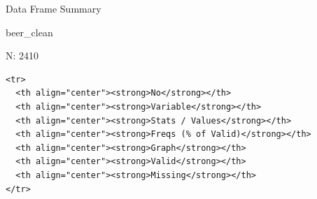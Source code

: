 \documentclass[]{article}
\newenvironment{Shaded}{\begin{snugshade}}{\end{snugshade}}
\newcommand{\KeywordTok}[1]{\textcolor[rgb]{0.13,0.29,0.53}{\textbf{#1}}}
\newcommand{\DataTypeTok}[1]{\textcolor[rgb]{0.13,0.29,0.53}{#1}}
\newcommand{\StringTok}[1]{\textcolor[rgb]{0.31,0.60,0.02}{#1}}
\newcommand{\CommentTok}[1]{\textcolor[rgb]{0.56,0.35,0.01}{\textit{#1}}}
\newcommand{\OperatorTok}[1]{\textcolor[rgb]{0.81,0.36,0.00}{\textbf{#1}}}
\newcommand{\NormalTok}[1]{#1}
\begin{document}
\begin{Shaded}
\end{Shaded}

Data Frame Summary

beer\_clean

N: 2410

\begin{verbatim}
<tr>
  <th align="center"><strong>No</strong></th>
  <th align="center"><strong>Variable</strong></th>
  <th align="center"><strong>Stats / Values</strong></th>
  <th align="center"><strong>Freqs (% of Valid)</strong></th>
  <th align="center"><strong>Graph</strong></th>
  <th align="center"><strong>Valid</strong></th>
  <th align="center"><strong>Missing</strong></th>
</tr>
\end{verbatim}
\end{document}
